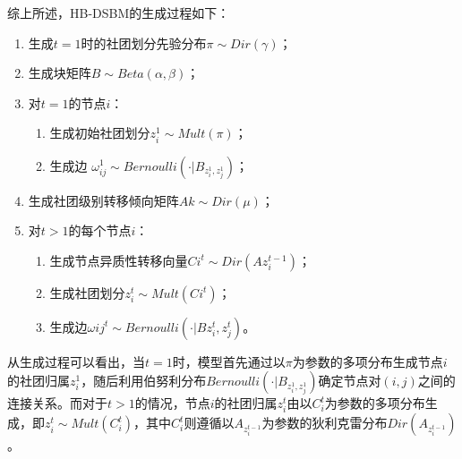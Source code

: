 综上所述，HB-DSBM的生成过程如下：
\begin{enumerate}
\item  生成$t=1$时的社团划分先验分布${\pi} \sim Dir({\gamma})$；
\item 生成块矩阵$B \sim Beta({\alpha}, {\beta})$；
\item 对$t=1$的节点$i$：
\begin{enumerate}
\item 生成初始社团划分$z_i^1 \sim Mult({\pi})$；
\item 生成边 $\omega_{ij}^1 \sim Bernoulli(\cdot | B_{z_i^1, z_j^1})$；
\end{enumerate}
\item 生成社团级别转移倾向矩阵${A}k \sim Dir({\mu})$；
\item 对$t>1$的每个节点$i$：
\begin{enumerate}
\item 生成节点异质性转移向量${C}i^t \sim Dir({A}{z_i^{t-1}})$；
\item 生成社团划分$z_i^t \sim Mult({C}i^t)$；
\item 生成边$\omega{ij}^t \sim Bernoulli(\cdot | B{z_i^t, z_j^t})$。
\end{enumerate}
\end{enumerate}





从生成过程可以看出，当$t=1$时，模型首先通过以$\pi$为参数的多项分布生成节点$i$的社团归属$z_i^1$，随后利用伯努利分布$Bernoulli(\cdot|B_{z_i^1,z_j^1})$确定节点对$(i,j)$之间的连接关系。而对于$t>1$的情况，节点$i$的社团归属$z_i^t$由以$C_i^t$为参数的多项分布生成，即$z_i^t \sim Mult({C}_i^t)$，其中$C_i^t$则遵循以$A_{z_i^{t-1}}$为参数的狄利克雷分布$Dir(A_{z_i^{t-1}})$。

